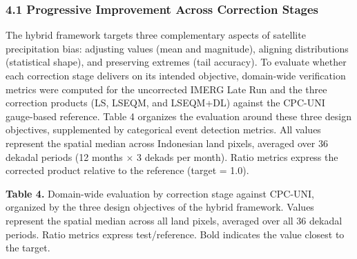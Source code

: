 \documentclass[
]{article}
\begin{document}
\subsubsection{4.1 Progressive Improvement Across Correction
Stages}\label{progressive-improvement-across-correction-stages}

The hybrid framework targets three complementary aspects of satellite
precipitation bias: adjusting values (mean and magnitude), aligning
distributions (statistical shape), and preserving extremes (tail
accuracy). To evaluate whether each correction stage delivers on its
intended objective, domain-wide verification metrics were computed for
the uncorrected IMERG Late Run and the three correction products (LS,
LSEQM, and LSEQM+DL) against the CPC-UNI gauge-based reference. Table 4
organizes the evaluation around these three design objectives,
supplemented by categorical event detection metrics. All values
represent the spatial median across Indonesian land pixels, averaged
over 36 dekadal periods (12 months \(\times\) 3 dekads per month). Ratio
metrics express the corrected product relative to the reference (target
= 1.0).

\textbf{Table 4.} Domain-wide evaluation by correction stage against
CPC-UNI, organized by the three design objectives of the hybrid
framework. Values represent the spatial median across all land pixels,
averaged over all 36 dekadal periods. Ratio metrics express
test/reference. Bold indicates the value closest to the target.
\end{document}
